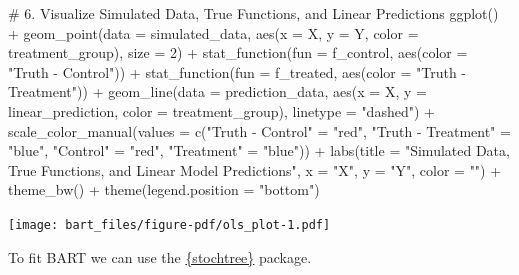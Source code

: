 \documentclass[
  letterpaper,
  DIV=11,
  numbers=noendperiod]{scrreprt}
\newenvironment{Shaded}{\begin{snugshade}}{\end{snugshade}}
\newcommand{\AttributeTok}[1]{\textcolor[rgb]{0.40,0.45,0.13}{#1}}
\newcommand{\CommentTok}[1]{\textcolor[rgb]{0.37,0.37,0.37}{#1}}
\newcommand{\DecValTok}[1]{\textcolor[rgb]{0.68,0.00,0.00}{#1}}
\newcommand{\FunctionTok}[1]{\textcolor[rgb]{0.28,0.35,0.67}{#1}}
\newcommand{\NormalTok}[1]{\textcolor[rgb]{0.00,0.23,0.31}{#1}}
\newcommand{\OtherTok}[1]{\textcolor[rgb]{0.00,0.23,0.31}{#1}}
\newcommand{\SpecialCharTok}[1]{\textcolor[rgb]{0.37,0.37,0.37}{#1}}
\newcommand{\StringTok}[1]{\textcolor[rgb]{0.13,0.47,0.30}{#1}}
\begin{document}
\begin{Shaded}
\begin{Highlighting}[]
\CommentTok{\# 6. Visualize Simulated Data, True Functions, and Linear Predictions}
\FunctionTok{ggplot}\NormalTok{() }\SpecialCharTok{+}
  \FunctionTok{geom\_point}\NormalTok{(}\AttributeTok{data =}\NormalTok{ simulated\_data, }\FunctionTok{aes}\NormalTok{(}\AttributeTok{x =}\NormalTok{ X, }\AttributeTok{y =}\NormalTok{ Y, }\AttributeTok{color =}\NormalTok{ treatment\_group), }\AttributeTok{size =} \DecValTok{2}\NormalTok{) }\SpecialCharTok{+}
  \FunctionTok{stat\_function}\NormalTok{(}\AttributeTok{fun =}\NormalTok{ f\_control, }\FunctionTok{aes}\NormalTok{(}\AttributeTok{color =} \StringTok{"Truth {-} Control"}\NormalTok{)) }\SpecialCharTok{+}
  \FunctionTok{stat\_function}\NormalTok{(}\AttributeTok{fun =}\NormalTok{ f\_treated, }\FunctionTok{aes}\NormalTok{(}\AttributeTok{color =} \StringTok{"Truth {-} Treatment"}\NormalTok{)) }\SpecialCharTok{+}
  \FunctionTok{geom\_line}\NormalTok{(}\AttributeTok{data =}\NormalTok{ prediction\_data, }\FunctionTok{aes}\NormalTok{(}\AttributeTok{x =}\NormalTok{ X, }\AttributeTok{y =}\NormalTok{ linear\_prediction, }
                                        \AttributeTok{color =}\NormalTok{ treatment\_group), }\AttributeTok{linetype =} \StringTok{"dashed"}\NormalTok{) }\SpecialCharTok{+}
  \FunctionTok{scale\_color\_manual}\NormalTok{(}\AttributeTok{values =} \FunctionTok{c}\NormalTok{(}\StringTok{"Truth {-} Control"} \OtherTok{=} \StringTok{"red"}\NormalTok{,  }
                                \StringTok{"Truth {-} Treatment"} \OtherTok{=} \StringTok{"blue"}\NormalTok{,}
                                \StringTok{"Control"} \OtherTok{=} \StringTok{"red"}\NormalTok{,           }
                                \StringTok{"Treatment"} \OtherTok{=} \StringTok{"blue"}\NormalTok{)) }\SpecialCharTok{+}    
  \FunctionTok{labs}\NormalTok{(}\AttributeTok{title =} \StringTok{"Simulated Data, True Functions, and Linear Model Predictions"}\NormalTok{,}
       \AttributeTok{x =} \StringTok{"X"}\NormalTok{, }\AttributeTok{y =} \StringTok{"Y"}\NormalTok{, }\AttributeTok{color =} \StringTok{""}\NormalTok{) }\SpecialCharTok{+}
  \FunctionTok{theme\_bw}\NormalTok{() }\SpecialCharTok{+}
  \FunctionTok{theme}\NormalTok{(}\AttributeTok{legend.position =} \StringTok{"bottom"}\NormalTok{) }
\end{Highlighting}
\end{Shaded}

\texttt{[image: bart\_files/figure-pdf/ols\_plot-1.pdf]}

To fit BART we can use the
\href{https://stochastictree.github.io/stochtree-r/}{\{stochtree\}}
package.
\end{document}
